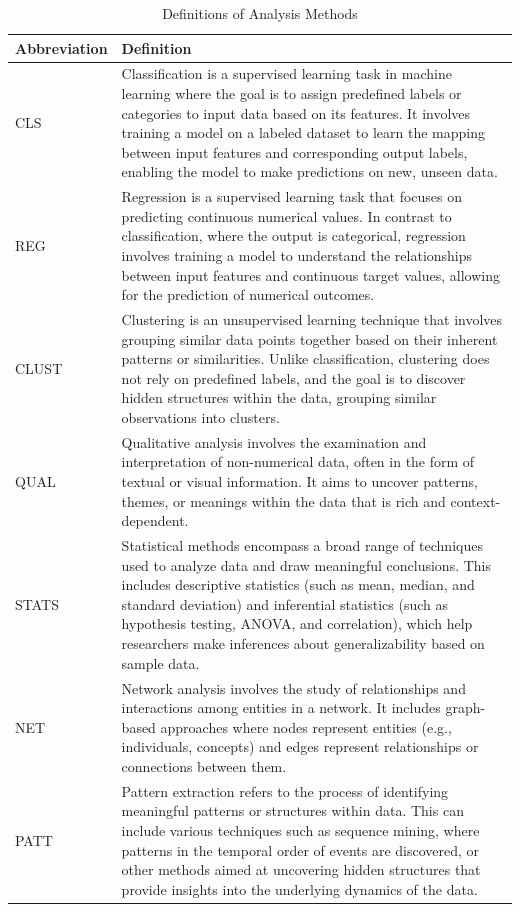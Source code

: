 \documentclass[manuscript,screen,review]{acmart}
\begin{document}
\begin{table}[ht]
\centering
\caption{Definitions of Analysis Methods}
\begin{tabular}{|l|p{}|}
\hline
\textbf{Abbreviation} & \textbf{Definition} \\
\hline
CLS & Classification is a supervised learning task in machine learning where the goal is to assign predefined labels or categories to input data based on its features. It involves training a model on a labeled dataset to learn the mapping between input features and corresponding output labels, enabling the model to make predictions on new, unseen data. \\
\hline
REG & Regression is a supervised learning task that focuses on predicting continuous numerical values. In contrast to classification, where the output is categorical, regression involves training a model to understand the relationships between input features and continuous target values, allowing for the prediction of numerical outcomes. \\
\hline
CLUST & Clustering is an unsupervised learning technique that involves grouping similar data points together based on their inherent patterns or similarities. Unlike classification, clustering does not rely on predefined labels, and the goal is to discover hidden structures within the data, grouping similar observations into clusters. \\
\hline
QUAL & Qualitative analysis involves the examination and interpretation of non-numerical data, often in the form of textual or visual information. It aims to uncover patterns, themes, or meanings within the data that is rich and context-dependent. \\
\hline
STATS & Statistical methods encompass a broad range of techniques used to analyze data and draw meaningful conclusions. This includes descriptive statistics (such as mean, median, and standard deviation) and inferential statistics (such as hypothesis testing, ANOVA, and correlation), which help researchers make inferences about generalizability based on sample data. \\
\hline
NET & Network analysis involves the study of relationships and interactions among entities in a network. It includes graph-based approaches where nodes represent entities (e.g., individuals, concepts) and edges represent relationships or connections between them.  \\
\hline
PATT & Pattern extraction refers to the process of identifying meaningful patterns or structures within data. This can include various techniques such as sequence mining, where patterns in the temporal order of events are discovered, or other methods aimed at uncovering hidden structures that provide insights into the underlying dynamics of the data. \\
\hline
\end{tabular}
\label{tab:analysis_methods}
\end{table}
\end{document}
